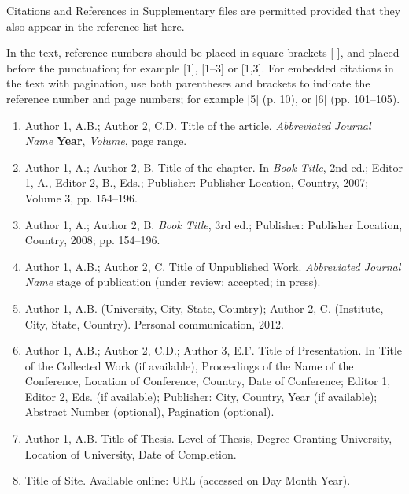 \documentclass{article} %
\begin{document}
\noindent 

\noindent Citations and References in Supplementary files are permitted provided that they also appear in the reference list here. 

\noindent 

\noindent In the text, reference numbers should be placed in square brackets [ ], and placed before the punctuation; for example [1], [1--3] or [1,3]. For embedded citations in the text with pagination, use both parentheses and brackets to indicate the reference number and page numbers; for example [5] (p. 10), or [6] (pp. 101--105).

\noindent 

\begin{enumerate}
\item  Author 1, A.B.; Author 2, C.D. Title of the article. \textit{Abbreviated Journal Name} \textbf{Year}, \textit{Volume}, page range.

\item  Author 1, A.; Author 2, B. Title of the chapter. In \textit{Book Title}, 2nd ed.; Editor 1, A., Editor 2, B., Eds.; Publisher: Publisher Location, Country, 2007; Volume 3, pp. 154--196.

\item  Author 1, A.; Author 2, B. \textit{Book Title}, 3rd ed.; Publisher: Publisher Location, Country, 2008; pp. 154--196.

\item  Author 1, A.B.; Author 2, C. Title of Unpublished Work. \textit{Abbreviated Journal Name} stage of publication (under review; accepted; in press).

\item  Author 1, A.B. (University, City, State, Country); Author 2, C. (Institute, City, State, Country). Personal communication, 2012.

\item  Author 1, A.B.; Author 2, C.D.; Author 3, E.F. Title of Presentation. In Title of the Collected Work (if available), Proceedings of the Name of the Conference, Location of Conference, Country, Date of Conference; Editor 1, Editor 2, Eds. (if available); Publisher: City, Country, Year (if available); Abstract Number (optional), Pagination (optional).

\item  Author 1, A.B. Title of Thesis. Level of Thesis, Degree-Granting University, Location of University, Date of Completion.

\item  Title of Site. Available online: URL (accessed on Day Month Year).
\end{enumerate}
\end{document}
